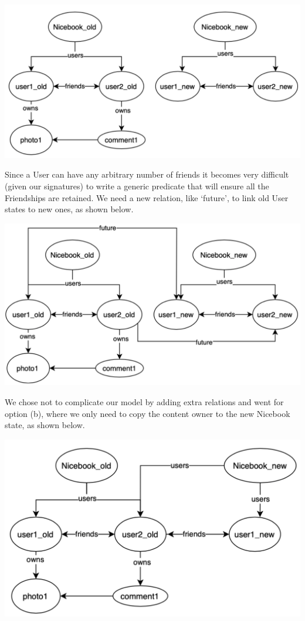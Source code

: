 \documentclass[titlepage]{article}
\begin{document}
\begin{enumerate}
	      \includegraphics[width=6in]{images/modeling_decision_1.png}

	      Since a User can have any arbitrary number of friends it becomes very difficult (given our signatures) to write a generic predicate that will ensure all the Friendships are retained. We need a new relation, like ‘future’, to link old User states to new ones, as shown below.

	      \includegraphics[width=6in]{images/modeling_decision_2.png}

	      We chose not to complicate our model by adding extra relations and went for option (b), where we only need to copy the content owner to the new Nicebook state, as shown below.

	      \includegraphics[width=6in]{images/modeling_decision_3.png}


\end{enumerate}
\end{document}

